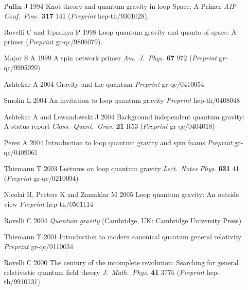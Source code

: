 \documentclass[aps,prd,tightenlines,showpacs,nofootinbib,preprint]{revtex4}
\begin{document}
\begin{thebibliography}{99}

  Pullin J 1994 Knot theory and quantum gravity in loop Space: A Primer
  {\it AIP Conf.\ Proc.}  {\bf 317} 141
  ({\it Preprint} hep-th/9301028).


  Rovelli C and Upadhya P 1998
  Loop quantum gravity and quanta of space: A primer
  ({\it Preprint} gr-qc/9806079).

 Major S A 1999
  A spin network primer
  {\it Am.\ J.\ Phys.}  {\bf 67} 972
  ({\it Preprint} gr-qc/9905020)



 Ashtekar A 2004 Gravity and the quantum
  {\it Preprint} gr-qc/0410054

  Smolin L 2004 An invitation to loop quantum gravity
  {\it Preprint} hep-th/0408048

 Ashtekar A and Lewandowski J 2004
  Background independent quantum gravity: A status report
  {\it Class.\ Quant.\ Grav.}  {\bf 21} R53
  ({\it Preprint} gr-qc/0404018)

  Perez A 2004
  Introduction to loop quantum gravity and spin foams
  {\it Preprint} gr-qc/0409061

  Thiemann T 2003 Lectures on loop quantum gravity
  {\it Lect.\ Notes Phys.}  {\bf 631} 41
  ({\it Preprint} gr-qc/0210094)

  Nicolai H, Peeters K and Zamaklar M 2005
  Loop quantum gravity: An outside view
 {\it Preprint} hep-th/0501114

  Rovelli C 2004 {\it Quantum gravity}
(Cambridge, UK: Cambridge University Press)

 Thiemann T 2001 Introduction to modern canonical
quantum general relativity {\it Preprint} gr-qc/0110034

  Rovelli C 2000 The century of the incomplete revolution:
  Searching for general  relativistic quantum field theory
  {\it J.\ Math.\ Phys.}  {\bf 41} 3776
  ({\it Preprint} hep-th/9910131)


\end{thebibliography}
\end{document}
